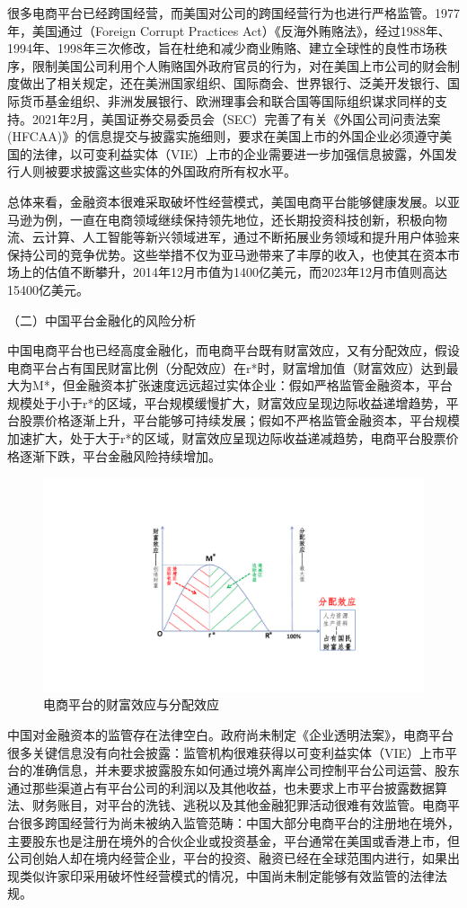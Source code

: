 \documentclass[12pt,twoside,utf8]{ctexart}
\begin{document}
很多电商平台已经跨国经营，而美国对公司的跨国经营行为也进行严格监管。1977年，美国通过（Foreign Corrupt Practices Act）《反海外贿赂法》，经过1988年、1994年、1998年三次修改，旨在杜绝和减少商业贿赂、建立全球性的良性市场秩序，限制美国公司利用个人贿赂国外政府官员的行为，对在美国上市公司的财会制度做出了相关规定，还在美洲国家组织、国际商会、世界银行、泛美开发银行、国际货币基金组织、非洲发展银行、欧洲理事会和联合国等国际组织谋求同样的支持。2021年2月，美国证券交易委员会（SEC）完善了有关《外国公司问责法案(HFCAA)》的信息提交与披露实施细则，要求在美国上市的外国企业必须遵守美国的法律，以可变利益实体（VIE）上市的企业需要进一步加强信息披露，外国发行人则被要求披露这些实体的外国政府所有权水平。

总体来看，金融资本很难采取破坏性经营模式，美国电商平台能够健康发展。以亚马逊为例，一直在电商领域继续保持领先地位，还长期投资科技创新，积极向物流、云计算、人工智能等新兴领域进军，通过不断拓展业务领域和提升用户体验来保持公司的竞争优势。这些举措不仅为亚马逊带来了丰厚的收入，也使其在资本市场上的估值不断攀升，2014年12月市值为1400亿美元，而2023年12月市值则高达15400亿美元。

（二）中国平台金融化的风险分析

中国电商平台也已经高度金融化，而电商平台既有财富效应，又有分配效应，假设电商平台占有国民财富比例（分配效应）在r*时，财富增加值（财富效应）达到最大为M*，但金融资本扩张速度远远超过实体企业：假如严格监管金融资本，平台规模处于小于r*的区域，平台规模缓慢扩大，财富效应呈现边际收益递增趋势，平台股票价格逐渐上升，平台能够可持续发展；假如不严格监管金融资本，平台规模加速扩大，处于大于r*的区域，财富效应呈现边际收益递减趋势，电商平台股票价格逐渐下跌，平台金融风险持续增加。

\begin{figure}[hbt!]
\centering
\includegraphics[width=0.7\linewidth]{3.pdf}
\caption{电商平台的财富效应与分配效应}
\label{fig:map}
\end{figure}


中国对金融资本的监管存在法律空白。政府尚未制定《企业透明法案》，电商平台很多关键信息没有向社会披露：监管机构很难获得以可变利益实体（VIE）上市平台的准确信息，并未要求披露股东如何通过境外离岸公司控制平台公司运营、股东通过那些渠道占有平台公司的利润以及其他收益，也未要求上市平台披露数据算法、财务账目，对平台的洗钱、逃税以及其他金融犯罪活动很难有效监管。电商平台很多跨国经营行为尚未被纳入监管范畴：中国大部分电商平台的注册地在境外，主要股东也是注册在境外的合伙企业或投资基金，平台通常在美国或香港上市，但公司创始人却在境内经营企业，平台的投资、融资已经在全球范围内进行，如果出现类似许家印采用破坏性经营模式的情况，中国尚未制定能够有效监管的法律法规。
\end{document}

